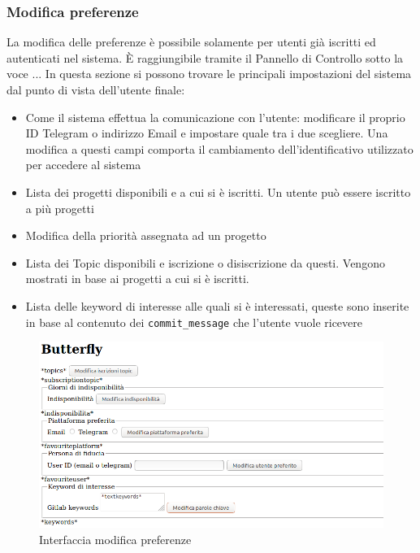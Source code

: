 \subsubsection{Modifica preferenze}
La modifica delle preferenze è possibile solamente per utenti già iscritti ed autenticati nel sistema.
È raggiungibile tramite il Pannello di Controllo sotto la voce ... %
In questa sezione si possono trovare le principali impostazioni del sistema dal punto di vista dell'utente finale:
\begin{itemize}
	\item Come il sistema effettua la comunicazione con l'utente: modificare il proprio ID Telegram o indirizzo Email e impostare quale tra i due scegliere. Una modifica a questi campi comporta il cambiamento dell'identificativo utilizzato per accedere al sistema
	\item Lista dei progetti disponibili e a cui si è iscritti. Un utente può essere iscritto a più progetti
	\item Modifica della priorità assegnata ad un progetto
	\item Lista dei Topic disponibili e iscrizione o disiscrizione da questi. Vengono mostrati in base ai progetti a cui si è iscritti.
	\item Lista delle keyword di interesse alle quali si è interessati, queste sono inserite in base al contenuto dei \texttt{commit\_message} che l'utente vuole ricevere
\end{itemize}
\begin{figure}[H]
	\centering
	\includegraphics[width=\textwidth]{img/preferenze_1.png} %
	\caption{Interfaccia modifica preferenze}
\end{figure}

